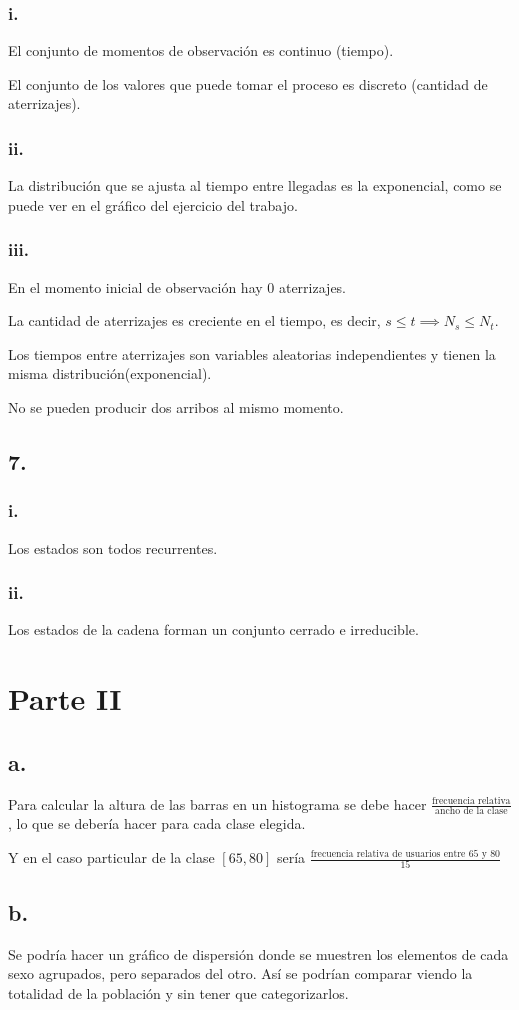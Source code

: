 \documentclass[12pt,fleqn]{article}
\begin{document}
\subsubsection*{i.}
El conjunto de momentos de observación es continuo (tiempo).

El conjunto de los valores que puede tomar el proceso es discreto (cantidad de aterrizajes).
\subsubsection*{ii.}
La distribución que se ajusta al tiempo entre llegadas es la exponencial, como se puede ver en el gráfico del ejercicio del trabajo.
\subsubsection*{iii.}
En el momento inicial de observación hay 0 aterrizajes.

La cantidad de aterrizajes es creciente en el tiempo, es decir, $s\le t\implies N_s\le N_t$.

Los tiempos entre aterrizajes son variables aleatorias independientes y tienen la misma distribución(exponencial).

No se pueden producir dos arribos al mismo momento.
\subsection*{7.}
\subsubsection*{i.}
Los estados son todos recurrentes.
\subsubsection*{ii.}
Los estados de la cadena forman un conjunto cerrado e irreducible.
\section*{Parte II}
\subsection*{a.}
Para calcular la altura de las barras en un histograma se debe hacer $\frac{\textrm{frecuencia relativa}}{\textrm{ancho de la clase}}$, lo que se debería hacer para cada clase elegida.

Y en el caso particular de la clase $[65,80]$ sería $\frac{\textrm{frecuencia relativa de usuarios entre 65 y 80}}{15}$
\subsection*{b.}
Se podría hacer un gráfico de dispersión donde se muestren los elementos de cada sexo agrupados, pero separados del otro. Así se podrían comparar viendo la totalidad de la población y sin tener que categorizarlos.
\end{document}
